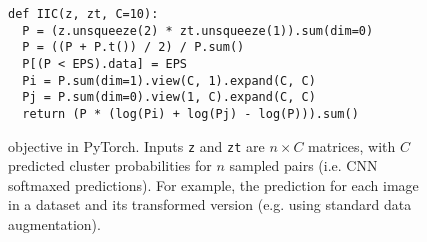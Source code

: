 



\begin{figure}[t]

\begin{lstlisting}[style=mystyle]
def IIC(z, zt, C=10):
  P = (z.unsqueeze(2) * zt.unsqueeze(1)).sum(dim=0)
  P = ((P + P.t()) / 2) / P.sum()
  P[(P < EPS).data] = EPS
  Pi = P.sum(dim=1).view(C, 1).expand(C, C)
  Pj = P.sum(dim=0).view(1, C).expand(C, C)
  return (P * (log(Pi) + log(Pj) - log(P))).sum()
\end{lstlisting}

\caption{\label{f:code} \methodnameshort objective in PyTorch. Inputs \texttt{z} and \texttt{zt} are $n \times C$ matrices, with $C$ predicted cluster probabilities for $n$ sampled pairs (i.e. CNN softmaxed predictions). For example, the prediction for each image in a dataset and its transformed version (e.g. using standard data augmentation).}
\end{figure}